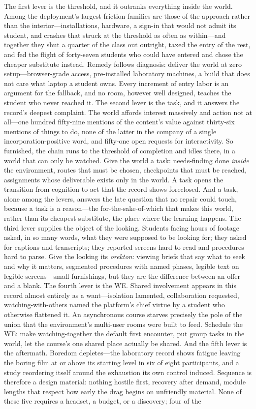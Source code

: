 \documentclass{article}
\begin{document}
The first lever is the threshold, and it outranks everything inside the world. Among the deployment's largest friction families are those of the approach rather than the interior---installations, hardware, a sign-in that would not admit its student, and crashes that struck at the threshold as often as within---and together they shut a quarter of the class out outright, taxed the entry of the rest, and fed the flight of forty-seven students who could have entered and chose the cheaper substitute instead. Remedy follows diagnosis: deliver the world at zero setup---browser-grade access, pre-installed laboratory machines, a build that does not care what laptop a student owns. Every increment of entry labor is an argument for the fallback, and no room, however well designed, teaches the student who never reached it. The second lever is the task, and it answers the record's deepest complaint. The world affords interest massively and action not at all---one hundred fifty-nine mentions of the content's value against thirty-six mentions of things to do, none of the latter in the company of a single incorporation-positive word, and fifty-one open requests for interactivity. So furnished, the chain runs to the threshold of completion and idles there, in a world that can only be watched. Give the world a task: needs-finding done \textit{inside} the environment, routes that must be chosen, checkpoints that must be reached, assignments whose deliverable exists only in the world. A task opens the transition from cognition to act that the record shows foreclosed. And a task, alone among the levers, answers the late question that no repair could touch, because a task is a reason---the for-the-sake-of-which that makes this world, rather than its cheapest substitute, the place where the learning happens. The third lever supplies the object of the looking. Students facing hours of footage asked, in so many words, what they were supposed to be looking for; they asked for captions and transcripts; they reported screens hard to read and procedures hard to parse. Give the looking its \textit{orekton}: viewing briefs that say what to seek and why it matters, segmented procedures with named phases, legible text on legible screens---small furnishings, but they are the difference between an offer and a blank. The fourth lever is the WE. Shared involvement appears in this record almost entirely as a want---isolation lamented, collaboration requested, watching-with-others named the platform's chief virtue by a student who otherwise flattened it. An asynchronous course starves precisely the pole of the union that the environment's multi-user rooms were built to feed. Schedule the WE: make watching-together the default first encounter, put group tasks in the world, let the course's one shared place actually be shared. And the fifth lever is the aftermath. Boredom depletes---the laboratory record shows fatigue leaving the boring film at or above its starting level in six of eight participants, and a study reordering itself around the exhaustion its own control induced. Sequence is therefore a design material: nothing hostile first, recovery after demand, module lengths that respect how early the drag begins on unfriendly material. None of these five requires a headset, a budget, or a discovery; four of the 
\end{document}
